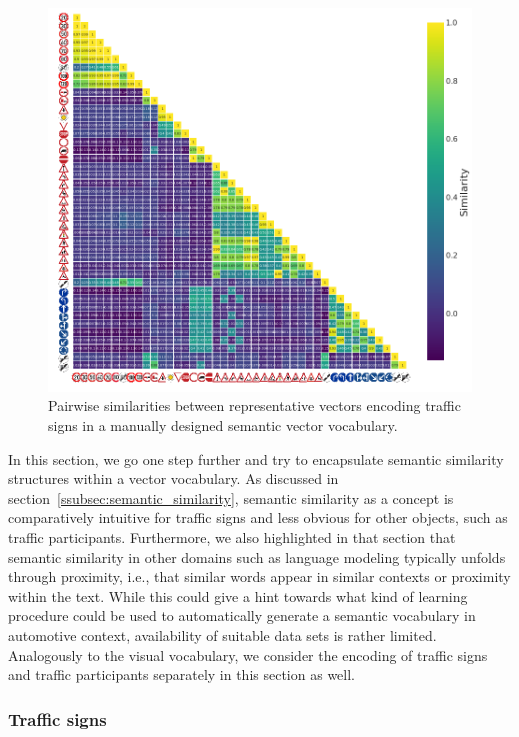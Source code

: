 \begin{figure}[t]
    \centering
    \includegraphics[width=0.8\linewidth]{imgs/semantic_vocab_traffic_signs_internal_similarities.png}
    \caption{Pairwise similarities between representative vectors encoding traffic signs in a manually designed semantic vector vocabulary.}
    \label{fig:semantic_vocab_traffic_signs_internal_similarities}
\end{figure}
In this section, we go one step further and try to encapsulate semantic similarity structures within a vector vocabulary.
As discussed in section~\ref{ssubsec:semantic_similarity}, semantic similarity as a concept is comparatively intuitive for traffic signs and less obvious for other objects, such as traffic participants.
Furthermore, we also highlighted in that section that semantic similarity in other domains such as language modeling typically unfolds through proximity, i.e., that similar words appear in similar contexts or proximity within the text.
While this could give a hint towards what kind of learning procedure could be used to automatically generate a semantic vocabulary in automotive context, availability of suitable data sets is rather limited.
Analogously to the visual vocabulary, we consider the encoding of traffic signs and traffic participants separately in this section as well. 

\subsubsection{Traffic signs}%
\label{ssubsec:traffic_signs}

